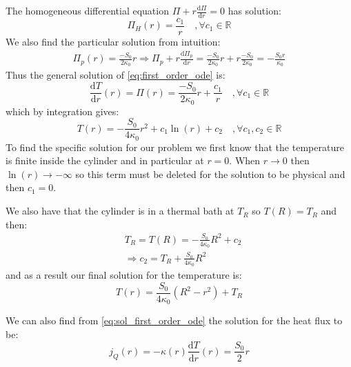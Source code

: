 The homogeneous differential equation $\Pi + r\frac{\mathrm{d}\Pi}{\mathrm{d}r} = 0$ has solution:
\begin{equation}
    \Pi_H(r) = \frac{c_1}{r} \quad, \forall c_1\in\mathbb{R}
\end{equation}
We also find the particular solution from intuition:
\begin{equation}
    \begin{aligned}
        \Pi_p(r) = \frac{-S_0}{2\kappa_0}r
        \Rightarrow \Pi_p + r\frac{\mathrm{d}\Pi_p}{\mathrm{d}r} = \frac{-S_0}{2\kappa_0}r + r\frac{-S_0}{2\kappa_0} = -\frac{S_0 r}{\kappa_0}
    \end{aligned}
\end{equation}
Thus the general solution of \autoref{eq:first_order_ode} is:
\begin{equation}
    \frac{\mathrm{d}T}{\mathrm{d}r}(r) = \Pi(r) = \frac{-S_0}{2\kappa_0}r + \frac{c_1}{r} \quad, \forall c_1\in\mathbb{R}
    \label{eq:sol_first_order_ode}
\end{equation}
which by integration gives:
\begin{equation}
    T(r) = -\frac{S_0}{4\kappa_0}r^2 + c_1\ln(r) + c_2 \quad, \forall c_1, c_2\in\mathbb{R}
\end{equation}
To find the specific solution for our problem we first know that the temperature is finite inside the cylinder and in particular at $r=0$. When $r\to0$ then $\ln(r)\to-\infty$ so this term must be deleted for the solution to be physical and then $c_1=0$.

We also have that the cylinder is in a thermal bath at $T_R$ so $T(R) = T_R$ and then:
\begin{equation}
    \begin{aligned}
        & T_R = T(R) = -\frac{S_0}{4\kappa_0}R^2 + c_2 \\
        & \Rightarrow c_2 = T_R + \frac{S_0}{4\kappa_0}R^2
    \end{aligned}
\end{equation}
and as a result our final solution for the temperature is:
\begin{equation}
    T(r) = \frac{S_0}{4\kappa_0}(R^2 - r^2) + T_R
    \label{eq:analytical_solution_T}
\end{equation}

We can also find from \autoref{eq:sol_first_order_ode} the solution for the heat flux to be:
\begin{equation}
    j_Q(r) = -\kappa(r)\frac{\mathrm{d}T}{\mathrm{d}r}(r) = \frac{S_0}{2}r
\end{equation}
